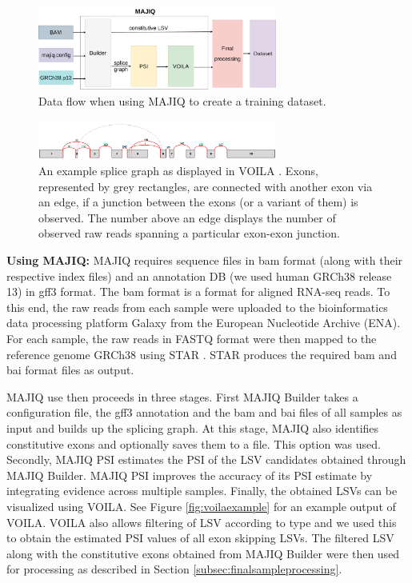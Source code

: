 \begin{figure}
	\centering\includegraphics[width=0.7\textwidth]{../visualizations/ch4-methods/visualizations-majiq.pdf} 
	\caption{Data flow when using MAJIQ to create a training dataset. }
	\label{fig:majiq_dataset_creation_process}
\end{figure}

\begin{figure}
	\centering\includegraphics[width=0.7\textwidth]{../visualizations/ch4-methods/splice_graph.png} 
	\caption{An example splice graph as displayed in VOILA \cite{majiq2}. Exons, represented by grey rectangles, are connected with another exon via an edge, if a junction between the exons (or a variant of them) is observed. The number above an edge displays the number of observed raw reads spanning a particular exon-exon junction.}
	\label{fig:splice_graph}
\end{figure}

\textbf{Using MAJIQ:} MAJIQ requires sequence files in bam format (along with their respective index files) and an annotation DB (we used human GRCh38 release 13) in gff3 format. The bam format is a format for aligned RNA-seq reads. 
To this end, the raw reads from each sample were uploaded to the bioinformatics data processing platform Galaxy \cite{galaxy} from the European Nucleotide Archive (ENA). For each sample, the raw reads in FASTQ format were then mapped to the reference genome GRCh38 using STAR \cite{star}. STAR produces the required bam and bai format files as output.

MAJIQ use then proceeds in three stages. First MAJIQ Builder takes a configuration file, the gff3 annotation and the bam and bai files of all samples as input and builds up the splicing graph. At this stage, MAJIQ also identifies constitutive exons and optionally saves them to a file. This option was used.
Secondly, MAJIQ PSI estimates the PSI of the LSV candidates obtained through MAJIQ Builder. MAJIQ PSI improves the accuracy of its PSI estimate by integrating evidence across multiple samples.
Finally, the obtained LSVs can be visualized using VOILA. See Figure \ref{fig:voilaexample} for an example output of VOILA. VOILA also allows filtering of LSV according to type and we used this to obtain the estimated PSI values of all exon skipping LSVs. The filtered LSV along with the constitutive exons obtained from MAJIQ Builder were then used for processing as described in Section \ref{subsec:finalsampleprocessing}.\\


